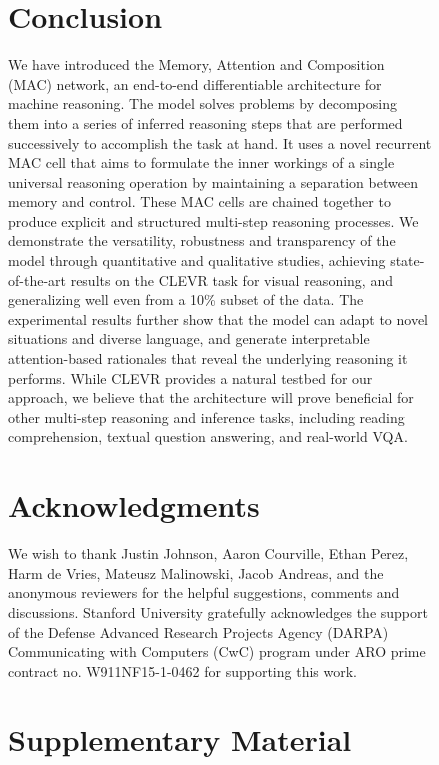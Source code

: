 \documentclass[fleqn]{article}
\begin{document}
\begin{figure}[t]
\begin{minipage}{0.55\textwidth}
\section{Conclusion}
We have introduced the Memory, Attention and Composition (MAC) network, an end-to-end differentiable architecture for machine reasoning. The model solves problems by decomposing them into a series of inferred reasoning steps that are performed successively to accomplish the task at hand. It uses a novel recurrent MAC cell that aims to formulate the inner workings of a single universal reasoning operation by maintaining a separation between memory and control. These MAC cells are chained together to produce explicit and structured multi-step reasoning processes. We demonstrate the versatility, robustness and transparency of the model through quantitative and qualitative studies, achieving state-of-the-art results on the CLEVR task for visual reasoning, and generalizing well even from a 10\% subset of the data. The experimental results further show that the model can adapt to novel situations and diverse language, and generate interpretable attention-based rationales that reveal the underlying reasoning it performs. While CLEVR provides a natural testbed for our approach, we believe that the architecture will prove beneficial for other multi-step reasoning and inference tasks, including reading comprehension, textual question answering, and real-world VQA.

\section{Acknowledgments}
We wish to thank Justin Johnson, Aaron Courville, Ethan Perez, Harm de Vries, Mateusz Malinowski, Jacob Andreas, and the anonymous reviewers for the helpful suggestions, comments and discussions. Stanford University gratefully acknowledges the support of the Defense Advanced
Research Projects Agency (DARPA) Communicating with Computers (CwC) program under ARO prime contract no. W911NF15-1-0462 for supporting this work.

\newpage



\newpage
\appendix

\section*{Supplementary Material}


\end{minipage}
\end{figure}
\end{document}
